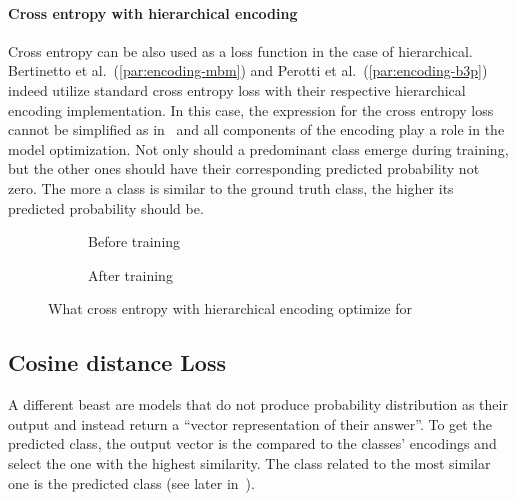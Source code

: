 \paragraph{Cross entropy with hierarchical encoding} Cross entropy can be also used as a loss function in the case of hierarchical. Bertinetto et al.~(\ref{par:encoding-mbm}) and Perotti et al.~(\ref{par:encoding-b3p}) indeed utilize standard cross entropy loss with their respective hierarchical encoding implementation. In this case, the expression for the cross entropy loss cannot be simplified as in~ and all components of the encoding play a role in the model optimization.
Not only should a predominant class emerge during training, but the other ones should have their corresponding predicted probability not zero. The more a class is similar to the ground truth class, the higher its predicted probability should be.
\begin{figure}[htbp]
  \centering
  \begin{subfigure}{0.45\textwidth}
    \centering
    \begin{minipage}{\textwidth}
      \resizebox{\linewidth}{!}{}
    \end{minipage}
    \caption{Before training}
    \label{fig:03/xe-hier-before}
  \end{subfigure}
  \begin{subfigure}{0.45\textwidth}
    \centering
    \begin{minipage}{\textwidth}
      \resizebox{\linewidth}{!}{}
    \end{minipage}
    \caption{After training}
    \label{fig:03/xe-hier-after}
  \end{subfigure}
  \caption{What cross entropy with hierarchical encoding optimize for}
\end{figure}

\subsection{Cosine distance Loss}
\label{subsec:cosine-distance-loss}

A different beast are models that do not produce probability distribution as their output and instead return a ``vector representation of their answer''. To get the predicted class, the output vector is the compared to the classes' encodings and select the one with the highest similarity. The class related to the most similar one is the predicted class (see later in~).


